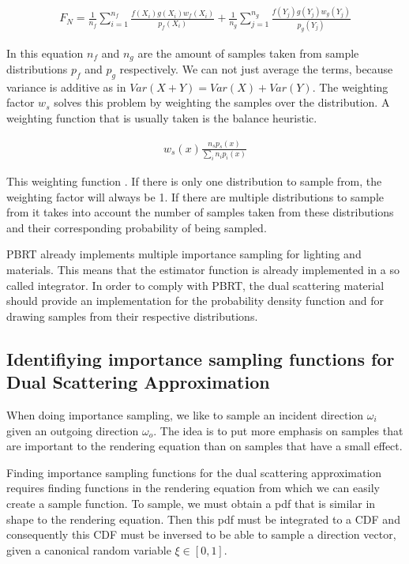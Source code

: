 \documentclass[12pt,a4paper,twoside]{article}
\begin{document}
\begin{align}
F_N = \frac{1}{n_f} \sum_{i=1}^{n_f} \frac{f(X_i) g(X_i) w_f(X_i)}{p_f(X_i)} + \frac{1}{n_g} \sum_{j=1}^{n_g} \frac{f(Y_j)g(Y_j)w_g(Y_j)}{p_g(Y_j)}
\end{align}

In this equation $n_f$ and $n_g$ are the amount of samples taken from sample distributions $p_f$ and $p_g$ respectively. We can not just average the terms, because variance is additive as in $Var(X+Y) = Var(X) + Var(Y)$. The weighting factor $w_s$ solves this problem by weighting the samples over the distribution. A weighting function that is usually taken is the balance heuristic.

\begin{align}
w_s(x) \frac{n_s p_s(x)}{\sum_i n_i p_i(x)}
\end{align}

This weighting function . If there is only one distribution to sample from, the weighting factor will always be 1. If there are multiple distributions to sample from it takes into account the number of samples taken from these distributions and their corresponding probability of being sampled.

PBRT already implements multiple importance sampling for lighting and materials. This means that the estimator function is already implemented in a so called integrator. In order to comply with PBRT, the dual scattering material should provide an implementation for the probability density function and for drawing samples from their respective distributions.



\subsection{Identifiying importance sampling functions for Dual Scattering Approximation}
When doing importance sampling, we like to sample an incident direction $\omega_i$ given an outgoing direction $\omega_o$. The idea is to put more emphasis on samples that are important to the rendering equation than on samples that have a small effect.

Finding importance sampling functions for the dual scattering approximation requires finding functions in the rendering equation from which we can easily create a sample function.
To sample, we must obtain a pdf that is similar in shape to the rendering equation. Then this pdf must be integrated to a CDF and consequently this CDF must be inversed to be able to sample a direction vector, given a canonical random variable $\xi \in [0, 1]$.
\end{document}
